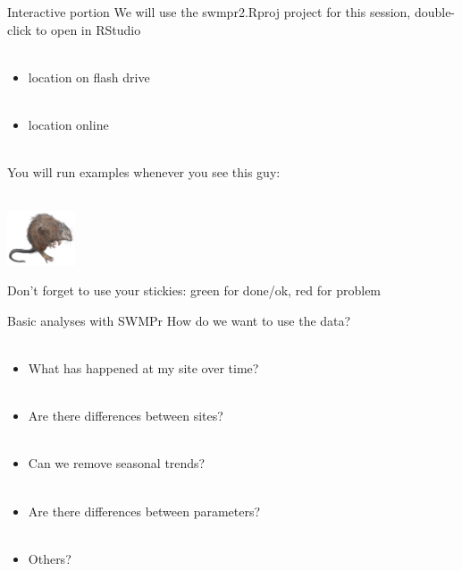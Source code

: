 \documentclass[xcolor=dvipsnames]{beamer}\usepackage[]{graphicx}\usepackage[]{color}
\begin{document}
\begin{frame}{Interactive portion}
\onslide<+->
We will use the swmpr2.Rproj project for this session, double-click to open in RStudio \\~\\
\begin{itemize}
\item location on flash drive\\~\\
\item location online \\~\\
\end{itemize}
\onslide<+->
You will run examples whenever you see this guy: \\~\\
\centerline{\includegraphics[width = 0.15\textwidth]{imgs/swmprat.png}} 
Don't forget to use your stickies: {\color{green} green} for done/ok, {\color{red} red} for problem
\end{frame}

\begin{frame}[t]{Basic analyses with SWMPr}
\onslide<+->
How do we want to use the data? \\~\\
\onslide<+->
\begin{itemize}
\item What has happened at my site over time? \\~\\
\item Are there differences between sites? \\~\\
\item Can we remove seasonal trends? \\~\\
\item Are there differences between parameters? \\~\\
\item Others?
\end{itemize}
\end{frame}
\end{document}
